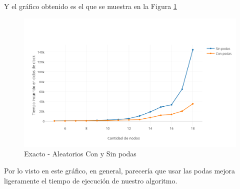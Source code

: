 Y el gráfico obtenido es el que se muestra en la Figura \ref{fig:1F}

\begin{figure}[htb]
	\begin{center}
    		\includegraphics[scale=0.6]{imagenes/exacto-aleatorio-conysin.png}
	\end{center}
	\caption{Exacto - Aleatorios Con y Sin podas\label{fig:1F}}
\end{figure}
\FloatBarrier
Por lo visto en este gráfico, en general, parecería que usar las podas mejora ligeramente el tiempo de ejecución de nuestro algoritmo.